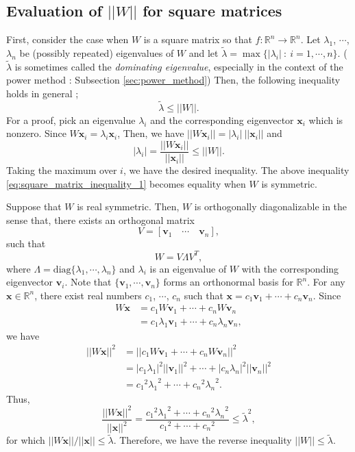 \documentclass[12pt]{report}
\numberwithin{figure}{chapter}
\theoremstyle{plain}
\theoremstyle{definition}
\theoremstyle{corollary}
\theoremstyle{definition}
\theoremstyle{plain}
\theoremstyle{definition}
\theoremstyle{plain}
\newcommand\bx{\ensuremath{\boldsymbol x}}
\newcommand\bv{\ensuremath{\boldsymbol v}}
\begin{document}
%
\subsection{Evaluation of \(||W||\) for square matrices}

First, consider the case when \(W\) is a square matrix so that \(f:\mathbb R^n\to\mathbb R^n\).
Let \(\lambda_1\), \(\cdots\), \(\lambda_n\) be (possibly repeated) eigenvalues of \(W\) and let \(\tilde\lambda=\max\{|\lambda_i|\::\:i=1,\cdots,n\}\).
(\(\tilde\lambda\) is sometimes called the \emph{dominating eigenvalue}, especially in the context of the power method : Subsection \ref{sec:power_method})
Then, the following inequality holds in general ;
\begin{equation}\label{eq:square_matrix_inequality_1}
\tilde\lambda\le||W||.
\end{equation}
For a proof, pick an eigenvalue \(\lambda_i\) and the corresponding eigenvector \(\bx_i\) which is nonzero.
Since \(W\bx_i=\lambda_i\bx_i\),
Then, we have \(||W\bx_i||=|\lambda_i|\:||\bx_i||\) and
\[|\lambda_i|=\frac{||W\bx_i||}{||\bx_i||}\le||W||.\]
Taking the maximum over \(i\), we have the desired inequality.
The above inequality \eqref{eq:square_matrix_inequality_1} becomes equality when \(W\) is symmetric.

Suppose that \(W\) is real symmetric.
Then, \(W\) is orthogonally diagonalizable in the sense that, there exists an orthogonal matrix
\[V=[\bv_1\quad \cdots \quad \bv_n],\]
such that
\[W=V\Lambda V^T,\]
where \(\Lambda=\text{diag}\{\lambda_1,\cdots,\lambda_n\}\) and \(\lambda_i\) is an eigenvalue of \(W\) with the corresponding eigenvector \(\bv_i\).
Note that \(\{\bv_1,\cdots,\bv_n\}\) forms an orthonormal basis for \(\mathbb R^n\).
For any \(\bx\in\mathbb R^n\), there exist real numbers \(c_1\), \(\cdots\), \(c_n\) such that \(\bx=c_1\bv_1+\cdots+c_n\bv_n\).
Since
\begin{align*}
W\bx
&=c_1W\bv_1+\cdots+c_nW\bv_n\\
&=c_1\lambda_1\bv_1+\cdots+c_n\lambda_n\bv_n,
\end{align*}
we have
\begin{align*}
||W\bx||^2
&=||c_1W\bv_1+\cdots+c_nW\bv_n||^2\\
&=|c_1\lambda_1|^2||\bv_1||^2+\cdots+|c_n\lambda_n|^2||\bv_n||^2\\
&={c_1}^2{\lambda_1}^2+\cdots+{c_n}^2{\lambda_n}^2.
\end{align*}
Thus,
\[\frac{||W\bx||^2}{||\bx||^2}=\frac{{c_1}^2{\lambda_1}^2+\cdots+{c_n}^2{\lambda_n}^2}{{c_1}^2+\cdots+{c_n}^2}
\le{\tilde\lambda}^2,\]
for which \(||W\bx||/||\bx||\le\tilde\lambda\).
Therefore, we have the reverse inequality \(||W||\le\tilde\lambda\).
\end{document}
